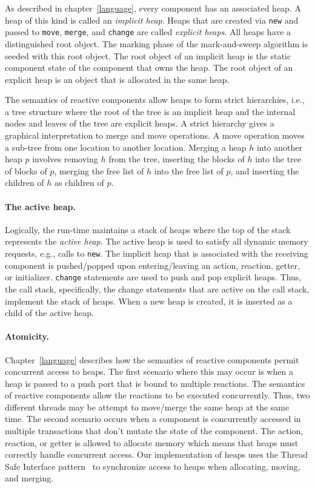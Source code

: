 As described in chapter~\ref{language}, every component has an associated heap.
A heap of this kind is called an \emph{implicit heap}.
Heaps that are created via \verb+new+ and passed to \verb+move+, \verb+merge+, and \verb+change+ are called \emph{explicit heaps}.
All heaps have a distinguished root object.
The marking phase of the mark-and-sweep algorithm is seeded with this root object.
The root object of an implicit heap is the static component state of the component that owns the heap.
The root object of an explicit heap is an object that is allocated in the same heap.

The semantics of reactive components allow heaps to form strict hierarchies, i.e., a tree structure where the root of the tree is an implicit heap and the internal nodes and leaves of the tree are explicit heaps.
A strict hierarchy gives a graphical interpretation to merge and move operations.
A move operation moves a sub-tree from one location to another location.
 Merging a heap $h$ into another heap $p$ involves removing $h$ from the tree, inserting the blocks of $h$ into the tree of blocks of $p$, merging the free list of $h$ into the free list of $p$, and inserting the children of $h$ as children of $p$.

\paragraph{The active heap.}
Logically, the run-time maintains a stack of heaps where the top of the stack represents the \emph{active heap}.
The active heap is used to satisfy all dynamic memory requests, e.g., calls to \verb+new+.
The implicit heap that is associated with the receiving component is pushed/popped upon entering/leaving an action, reaction, getter, or initializer.
\verb+change+ statements are used to push and pop explicit heaps.
Thus, the call stack, specifically, the change statements that are active on the call stack, implement the stack of heaps.
When a new heap is created, it is inserted as a child of the active heap.

\paragraph{Atomicity.}
Chapter~\ref{language} describes how the semantics of reactive components permit concurrent access to heaps.
The first scenario where this may occur is when a heap is passed to a push port that is bound to multiple reactions.
The semantics of reactive components allow the reactions to be executed concurrently.
Thus, two different threads may be attempt to move/merge the same heap at the same time.
The second scenario occurs when a component is concurrently accessed in multiple transactions that don't mutate the state of the component.
The action, reaction, or getter is allowed to allocate memory which means that heaps must correctly handle concurrent access.
Our implementation of heaps uses the Thread Safe Interface pattern~\cite{schmidt2000pattern} to synchronize access to heaps when allocating, moving, and merging.

